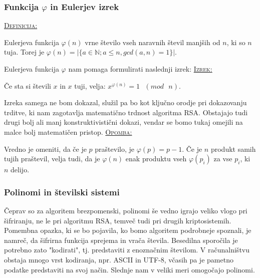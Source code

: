 \documentclass[a4paper, 12pt]{article} %
\newenvironment{matematika}[1]{
\textcolor{bostonuniversityred}{\underline{\textsc{#1:}}}
}{
}
\begin{document}
\subsubsection{Funkcija $\varphi$ in Eulerjev izrek}

\begin{matematika}{Definicija}
Eulerjeva funkcija $\varphi (n)$ vrne število vseh naravnih števil manjših od $n$, ki so $n$ tuja. Torej je $\varphi (n) = | \{ a \in \mathbb{N}; a \leq n, gcd(a, n) = 1 \} |$. \\
\end{matematika}

Eulerjeva funkcija $\varphi$ nam pomaga formulirati naslednji izrek:
\newline
\newline
\begin{matematika}{Izrek}
Če sta si števili $x$ in $x$ tuji, velja:
$x^{\varphi (n)} = 1 \text{ } (mod \text{ } n)$. \\
\end{matematika}

Izreka samega ne bom dokazal, služil pa bo kot ključno orodje pri dokazovanju trditve, ki nam zagotavlja matematično trdnost algoritma RSA. Obstajajo tudi drugi bolj ali manj konstruktivistični dokazi, vendar se bomo tukaj omejili na malce bolj matematičen pristop.
\newline
\newline
\begin{matematika}{Opomba}
Vredno je omeniti, da če je $p$ praštevilo, je $\varphi (p) = p - 1$. Če je $n$ produkt samih tujih praštevil, velja tudi, da je $\varphi (n)$ enak produktu vseh $\varphi (p_i)$ za vse $p_i$, ki $n$ delijo.
\end{matematika}

\subsubsection{Polinomi in številski sistemi}

Čeprav so za algoritem brezpomenski, polinomi še vedno igrajo veliko vlogo pri šifriranju, ne le pri algoritmu RSA, temveč tudi pri drugih kriptosistemih. Pomembna opazka, ki se bo pojavila, ko bomo algoritem podrobneje spoznali, je namreč, da šifrirna funkcija sprejema in vrača števila. Besedilna sporočila je potrebno zato "kodirati", tj. predstaviti z enoznačnim številom. V računalništvu obstaja mnogo vrst kodiranja, npr. ASCII in UTF-8, včasih pa je pametno podatke predstaviti na svoj način. Slednje nam v veliki meri omogočajo polinomi. \\
\end{document}
